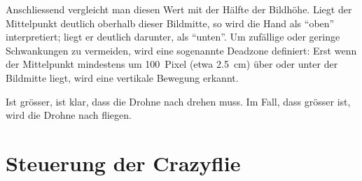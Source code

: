 Anschliessend vergleicht man diesen Wert mit der Hälfte der Bildhöhe.
Liegt der Mittelpunkt deutlich oberhalb dieser Bildmitte, so wird die Hand als \enquote{oben} interpretiert; liegt er deutlich darunter, als \enquote{unten}.
Um zufällige oder geringe Schwankungen zu vermeiden, wird eine sogenannte Deadzone definiert:
Erst wenn der Mittelpunkt mindestens um \SI{100}{Pixel} (etwa \SI{2.5}{\centi\meter}) über oder unter der Bildmitte liegt, wird eine vertikale Bewegung erkannt.

Ist  grösser, ist klar, dass die Drohne nach  drehen muss. Im Fall, dass  grösser ist, wird die Drohne nach  fliegen.

\section{Steuerung der Crazyflie}
\label{sec:cf_co}

\endgroup